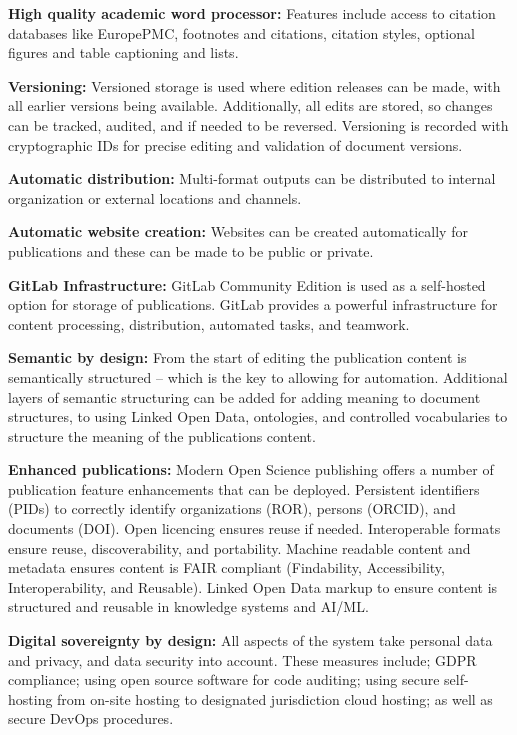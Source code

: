 \documentclass{article}
\begin{document}
\textbf{High quality academic word processor:} Features include access to citation databases like EuropePMC, footnotes and citations, citation styles, optional figures and table captioning and lists.


\textbf{Versioning:} Versioned storage is used where edition releases can be made, with all earlier versions being available. Additionally, all edits are stored, so changes can be tracked, audited, and if needed to be reversed. Versioning is recorded with cryptographic IDs for precise editing and validation of document versions.


\textbf{Automatic distribution:} Multi-format outputs can be distributed to internal organization or external locations and channels. 


\textbf{Automatic website creation:} Websites can be created automatically for publications and these can be made to be public or private.


\textbf{GitLab Infrastructure:} GitLab Community Edition is used as a self-hosted option for storage of publications. GitLab provides a powerful infrastructure for content processing, distribution, automated tasks, and teamwork.


\textbf{Semantic by design:} From the start of editing the publication content is semantically structured – which is the key to allowing for automation. Additional layers of semantic structuring can be added for adding meaning to document structures, to using Linked Open Data, ontologies, and controlled vocabularies to structure the meaning of the publications content.


\textbf{Enhanced publications:} Modern Open Science publishing offers a number of publication feature enhancements that can be deployed. Persistent identifiers (PIDs) to correctly identify organizations (ROR), persons (ORCID), and documents (DOI). Open licencing ensures reuse if needed. Interoperable formats ensure reuse, discoverability, and portability. Machine readable content and metadata ensures content is FAIR compliant (Findability, Accessibility, Interoperability, and Reusable). Linked Open Data markup to ensure content is structured and reusable in knowledge systems and AI/ML.


\textbf{Digital sovereignty by design:} All aspects of the system take personal data and privacy, and data security into account. These measures include; GDPR compliance; using open source software for code auditing; using secure self-hosting from on-site hosting to designated jurisdiction cloud hosting; as well as secure DevOps procedures.
\end{document}
